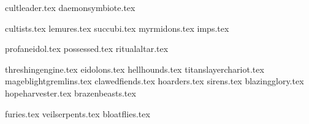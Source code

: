 
\renewcommand{\labels@mountsoptions}{\speciesarchetype}

{cultleader.tex}
{daemonsymbiote.tex}

\clearpage
{}
{cultists.tex}
\fluffbox{\corefluff{}}
{lemures.tex}
{succubi.tex}
{myrmidons.tex}
{imps.tex}

\clearpage
{}
{profaneidol.tex}
{possessed.tex}
{ritualaltar.tex}

\clearpage
{}
\fluffbox{\summonedfluff{}}
{threshingengine.tex}
{eidolons.tex}
{hellhounds.tex}
{titanslayerchariot.tex}
{mageblightgremlins.tex}
{clawedfiends.tex}
{hoarders.tex}
{sirens.tex}
{blazingglory.tex}
{hopeharvester.tex}
{brazenbeasts.tex}

\clearpage
{}
{furies.tex}
{veilserpents.tex}
{bloatflies.tex}
